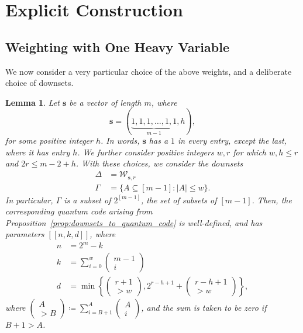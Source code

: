\documentclass{article}
\newcounter{main}[section]
\newtheorem{lemma}[main]{Lemma}
\begin{document}
\section{Explicit Construction}\label{sec:explicit_construction}






\subsection{Weighting with One Heavy Variable}

We now consider a very particular choice of the above weights, and a deliberate choice of downsets.
\begin{lemma}\label{lem:weighted_params}
    Let $\boldsymbol{s}$ be a vector of length $m$, where
\begin{equation}
    \boldsymbol{s} = (\underbrace{1, 1, 1, \ldots, 1, 1}_{m-1}, h),
\end{equation}
for some positive integer $h$. In words, $\boldsymbol{s}$ has a $1$ in every entry, except the last, where it has entry $h$. We further consider positive integers $w,r$ for which $w,h \leq r$ and $2r \leq m-2+h$. With these choices, we consider the downsets 
\begin{align}
    \Delta &= \mathcal{W}_{\boldsymbol{s},r}\\
    \Gamma &= \{A \subseteq [m-1]: |A| \leq w\}.
\end{align}
In particular, $\Gamma$ is a subset of $2^{[m-1]}$, the set of subsets of $[m-1]$. Then, the corresponding quantum code arising from Proposition~\ref{prop:downsets_to_quantum_code} is well-defined, and has parameters $[[n,k,d]]$, where
\begin{align}
    n &= 2^m - k\\
    k &= \sum_{i=0}^{w}\begin{pmatrix}
        m-1\\i
    \end{pmatrix}\\
    d &= \min\left\{\begin{pmatrix}r+1\\>w\end{pmatrix}, 2^{r-h+1} + \begin{pmatrix}r-h+1\\>w\end{pmatrix}\right\},\label{eq:wrm_distance_minimum}
\end{align}
where $\left(\begin{smallmatrix}A \\ >B\end{smallmatrix}\right) \coloneq \sum_{i=B+1}^A \left(\begin{smallmatrix}A\\i\end{smallmatrix}\right)$, and the sum is taken to be zero if $B+1 > A$.


\end{lemma}
\end{document}
